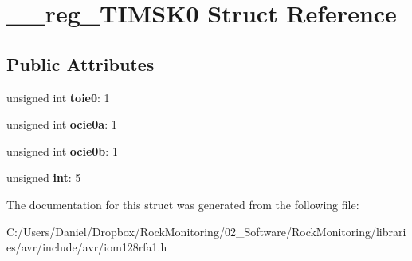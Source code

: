 \hypertarget{struct____reg___t_i_m_s_k0}{}\section{\+\_\+\+\_\+reg\+\_\+\+T\+I\+M\+S\+K0 Struct Reference}
\label{struct____reg___t_i_m_s_k0}
\subsection*{Public Attributes}
\begin{DoxyCompactItemize}
\item 
unsigned int {\bfseries toie0}\+: 1\hypertarget{struct____reg___t_i_m_s_k0_a750c5d3b9e831c7780aa6b64e14fe2bb}{}\label{struct____reg___t_i_m_s_k0_a750c5d3b9e831c7780aa6b64e14fe2bb}

\item 
unsigned int {\bfseries ocie0a}\+: 1\hypertarget{struct____reg___t_i_m_s_k0_a1b3a6385717530508390dac4dd68bc5d}{}\label{struct____reg___t_i_m_s_k0_a1b3a6385717530508390dac4dd68bc5d}

\item 
unsigned int {\bfseries ocie0b}\+: 1\hypertarget{struct____reg___t_i_m_s_k0_a20173f65a919b6f318669564d1573a63}{}\label{struct____reg___t_i_m_s_k0_a20173f65a919b6f318669564d1573a63}

\item 
unsigned {\bfseries int}\+: 5\hypertarget{struct____reg___t_i_m_s_k0_ad9ce1968b03a5d8aa10263976e091ceb}{}\label{struct____reg___t_i_m_s_k0_ad9ce1968b03a5d8aa10263976e091ceb}

\end{DoxyCompactItemize}


The documentation for this struct was generated from the following file\+:\begin{DoxyCompactItemize}
\item 
C\+:/\+Users/\+Daniel/\+Dropbox/\+Rock\+Monitoring/02\+\_\+\+Software/\+Rock\+Monitoring/libraries/avr/include/avr/iom128rfa1.\+h\end{DoxyCompactItemize}
